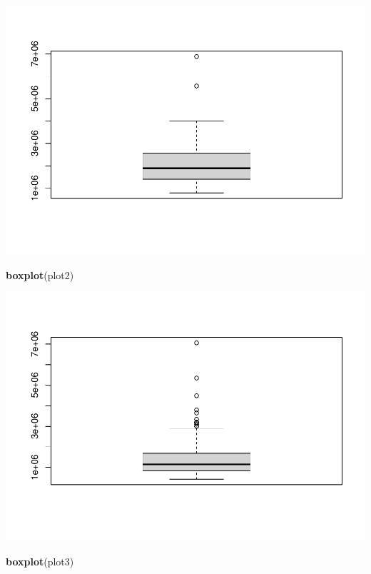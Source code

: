 \documentclass[
]{article}
\newenvironment{Shaded}{\begin{snugshade}}{\end{snugshade}}
\newcommand{\KeywordTok}[1]{\textcolor[rgb]{0.13,0.29,0.53}{\textbf{#1}}}
\newcommand{\NormalTok}[1]{#1}
\begin{document}
\includegraphics{HW2_Liu-Zi-Jian_files/figure-latex/unnamed-chunk-3-1.pdf}

\begin{Shaded}
\begin{Highlighting}[]
\KeywordTok{boxplot}\NormalTok{(plot2)}
\end{Highlighting}
\end{Shaded}

\includegraphics{HW2_Liu-Zi-Jian_files/figure-latex/unnamed-chunk-3-2.pdf}

\begin{Shaded}
\begin{Highlighting}[]
\KeywordTok{boxplot}\NormalTok{(plot3)}
\end{Highlighting}
\end{Shaded}
\end{document}
